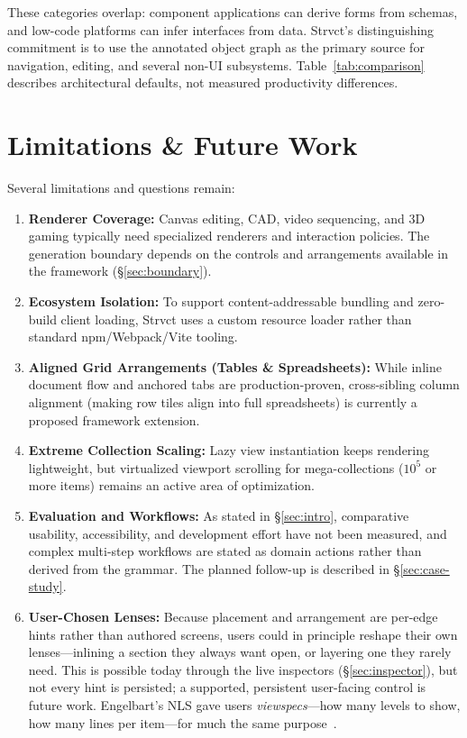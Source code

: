 \documentclass[sigplan,review,anonymous,10pt]{acmart}
\begin{document}
These categories overlap: component applications can derive forms from schemas, and low-code platforms can infer interfaces from data. Strvct's distinguishing commitment is to use the annotated object graph as the primary source for navigation, editing, and several non-UI subsystems. Table~\ref{tab:comparison} describes architectural defaults, not measured productivity differences.

\section{Limitations \& Future Work}
\label{sec:limitations}

Several limitations and questions remain:

\begin{enumerate}
\item \textbf{Renderer Coverage:} Canvas editing, CAD, video sequencing, and 3D gaming typically need specialized renderers and interaction policies. The generation boundary depends on the controls and arrangements available in the framework (\S\ref{sec:boundary}).
\item \textbf{Ecosystem Isolation:} To support content-addressable bundling and zero-build client loading, Strvct uses a custom resource loader rather than standard npm/Webpack/Vite tooling.
\item \textbf{Aligned Grid Arrangements (Tables \& Spreadsheets):} While inline document flow and anchored tabs are production-proven, cross-sibling column alignment (making row tiles align into full spreadsheets) is currently a proposed framework extension.
\item \textbf{Extreme Collection Scaling:} Lazy view instantiation keeps rendering lightweight, but virtualized viewport scrolling for mega-collections ($10^5$ or more items) remains an active area of optimization.
\item \textbf{Evaluation and Workflows:} As stated in \S\ref{sec:intro}, comparative usability, accessibility, and development effort have not been measured, and complex multi-step workflows are stated as domain actions rather than derived from the grammar. The planned follow-up is described in \S\ref{sec:case-study}.
\item \textbf{User-Chosen Lenses:} Because placement and arrangement are per-edge hints rather than authored screens, users could in principle reshape their own lenses---inlining a section they always want open, or layering one they rarely need. This is possible today through the live inspectors (\S\ref{sec:inspector}), but not every hint is persisted; a supported, persistent user-facing control is future work. Engelbart's NLS gave users \emph{viewspecs}---how many levels to show, how many lines per item---for much the same purpose~\cite{engelbart1968}.
\end{enumerate}
\end{document}
